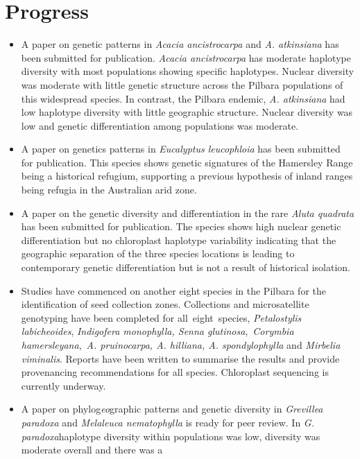 \documentclass[version=last,
    paper=a4, %
    10pt, %
    usenames,
    dvipsnames,
    oneside, %
    headings=openany, %
    DIV=15 %
]{scrbook}
\begin{document}
\section*{Progress}
\begin{itemize}
\itemsep1pt\parskip0pt
\item
  A paper on genetic patterns in \emph{Acacia ancistrocarpa} and
  \emph{A. atkinsiana} has been submitted for publication. \emph{Acacia
  ancistrocarpa} has moderate haplotype diversity with most populations
  showing specific haplotypes. Nuclear diversity was moderate with
  little genetic structure across the Pilbara populations of this
  widespread species. In contrast, the Pilbara endemic, \emph{A.
  atkinsiana} had low haplotype diversity with little geographic
  structure. Nuclear diversity was low and genetic differentiation among
  populations was moderate.
\item
  A paper on genetics patterns in \emph{Eucalyptus leucophloia} has been
  submitted for publication. This species shows genetic signatures of
  the Hamersley Range being a historical refugium, supporting a previous
  hypothesis of inland ranges being refugia in the Australian arid zone.
\item
  A paper on the genetic diversity and differentiation in the rare
  \emph{Aluta quadrata} has been submitted for publication. The species
  shows high nuclear genetic differentiation but no chloroplast
  haplotype variability indicating that the geographic separation of the
  three species locations is leading to contemporary genetic
  differentiation but is not a result of historical isolation.
\item
  Studies have commenced on another eight species in the Pilbara for the
  identification of seed collection zones. Collections and
  microsatellite genotyping have been completed for all~eight~species,
  \emph{Petalostylis labicheoides}, \emph{Indigofera monophylla, Senna
  glutinosa},~\emph{Corymbia hamersleyana},~\emph{A. pruinocarpa, A.
  hilliana, A. spondylophylla} and \emph{Mirbelia} \emph{viminalis}.
  Reports have been written to summarise the results and provide
  provenancing recommendations for all species. Chloroplast sequencing
  is currently underway.~
\item
  A paper on phylog\emph{eo}graphic patterns and genetic diversity in
  \emph{Grevillea paradoxa} and \emph{Melaleuca nematophylla} is ready
  for peer review. In \emph{G. paradoxa}haplotype diversity within
  populations was low, diversity was moderate overall and there was a

\end{itemize}
\end{document}
